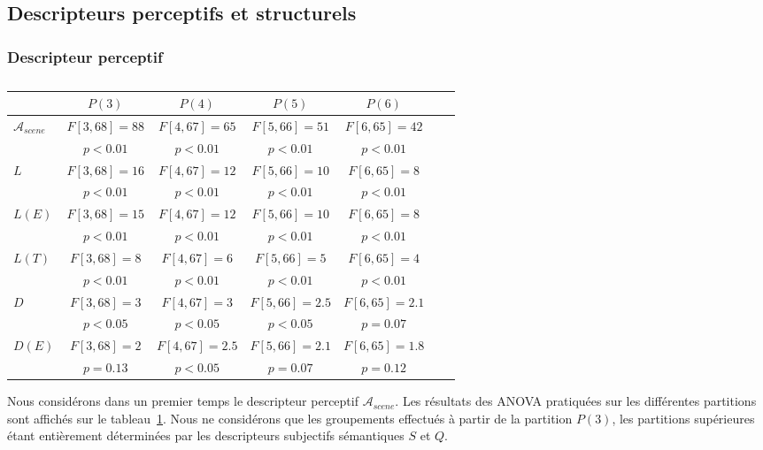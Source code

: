 \subsection{Descripteurs perceptifs et structurels}

\subsubsection{Descripteur perceptif}

\begin{table}[t]
\centering
\begin{tabular}{lcccccc}
                      & $P(3)$       & $P(4)$        & $P(5)$        & $P(6)$  \\
\hline
$\mathcal{A}_{scene}$ & $F[3,68]=88$ & $F[4,67]=65$  & $F[5,66]=51$  & $F[6,65]=42$  \\
                      & $p<0.01$     & $p<0.01$      & $p<0.01$      & $p<0.01$   \\
$L$                   & $F[3,68]=16$ & $F[4,67]=12$  & $F[5,66]=10$  & $F[6,65]=8$  \\
                      & $p<0.01$     & $p<0.01$      & $p<0.01$      & $p<0.01$   \\
$L(E)$                & $F[3,68]=15$ & $F[4,67]=12$  & $F[5,66]=10$  & $F[6,65]=8$  \\
                      & $p<0.01$     & $p<0.01$      & $p<0.01$      & $p<0.01$   \\
$L(T)$                & $F[3,68]=8$  & $F[4,67]=6$   & $F[5,66]=5$   & $F[6,65]=4$   \\
                      & $p<0.01$     & $p<0.01$      & $p<0.01$      & $p<0.01$   \\
$D$                   & $F[3,68]=3$  & $F[4,67]=3$   & $F[5,66]=2.5$ & $F[6,65]=2.1$  \\
                      & $p<0.05$     & $p<0.05$      & $p<0.05$      & $p=0.07$   \\
$D(E)$                & $F[3,68]=2$  & $F[4,67]=2.5$ & $F[5,66]=2.1$ & $F[6,65]=1.8$  \\
                      & $p=0.13$     & $p<0.05$      & $p=0.07$      & $p=0.12$   \\
\hline
\end{tabular}
\vspace{0.5mm}
\caption{}
\label{tab:ANOVAhac}
\end{table}

Nous considérons dans un premier temps le descripteur perceptif $\mathcal{A}_{scene}$. Les résultats des ANOVA pratiquées sur les différentes partitions sont affichés sur le tableau~\ref{tab:ANOVAhac}. Nous ne considérons que les groupements effectués à partir de la partition $P(3)$, les partitions supérieures étant entièrement déterminées par les descripteurs subjectifs sémantiques $S$ et $Q$. 

